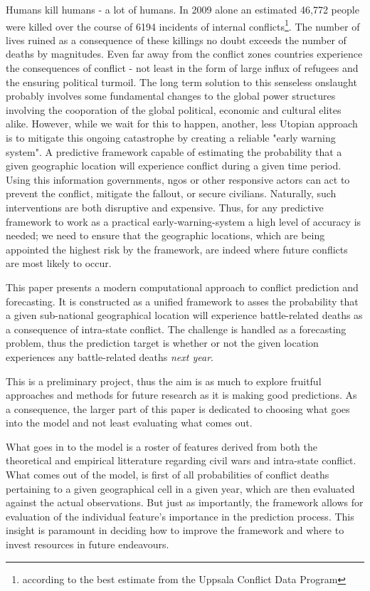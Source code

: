 \documentclass[a4paper]{article}
\begin{document}
Humans kill humans - a lot of humans. In 2009 alone an estimated 46,772 people were killed over the course of 6194 incidents of internal conflicts\footnote{according to the best estimate from the Uppsala Conflict Data Program}. The number of lives ruined as a consequence of these killings no doubt exceeds the number of deaths by magnitudes. Even far away from the conflict zones countries experience the consequences of conflict - not least in the form of large influx of refugees and the ensuring political turmoil. The long term solution to this senseless onslaught probably involves some fundamental changes to the global power structures involving the cooporation of the global political, economic and cultural elites alike. However, while we wait for this to happen, another, less Utopian approach is to mitigate this ongoing catastrophe by creating a reliable "early warning system". A predictive framework capable of estimating the probability that a given geographic location will experience conflict during a given time period. Using this information governments, ngos or other responsive actors can act to prevent the conflict, mitigate the fallout, or secure civilians. Naturally, such interventions are both disruptive and expensive. Thus, for any predictive framework to work as a practical early-warning-system a high level of accuracy is needed; we need to ensure that the geographic locations, which are being appointed the highest risk by the framework, are indeed where future conflicts are most likely to occur.\par

This paper presents a modern computational approach to conflict prediction and forecasting. It is constructed as a unified framework to asses the probability that a given sub-national geographical location will experience battle-related deaths as a consequence of intra-state conflict. The challenge is handled as a forecasting problem, thus the prediction target is whether or not the given location experiences any battle-related deaths \emph{next year}.\par 


This is a preliminary project, thus the aim is as much to explore fruitful approaches and methods for future research as it is making good predictions. As a consequence, the larger part of this paper is dedicated to choosing what goes into the model and not least evaluating what comes out.\par

What goes in to the model is a roster of features derived from both the theoretical and empirical litterature regarding civil wars and intra-state conflict. What comes out of the model, is first of all probabilities of conflict deaths pertaining to a given geographical cell in a given year, which are then evaluated against the actual observations. But just as importantly, the framework allows for evaluation of the individual feature's importance in the prediction process. This insight is paramount in deciding how to improve the framework and where to invest resources in future endeavours.\par
\end{document}
